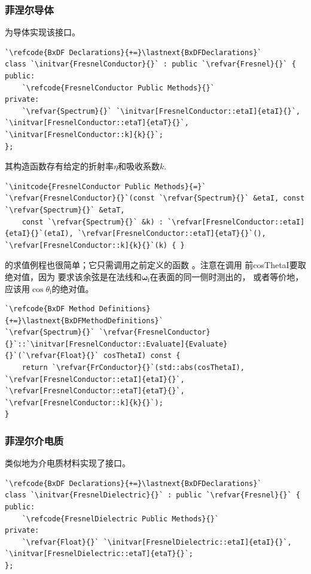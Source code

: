 \subsubsection*{菲涅尔导体}
为导体实现该接口。
\begin{lstlisting}
`\refcode{BxDF Declarations}{+=}\lastnext{BxDFDeclarations}`
class `\initvar{FresnelConductor}{}` : public `\refvar{Fresnel}{}` {
public:
    `\refcode{FresnelConductor Public Methods}{}`
private:
    `\refvar{Spectrum}{}` `\initvar[FresnelConductor::etaI]{etaI}{}`, `\initvar[FresnelConductor::etaT]{etaT}{}`, `\initvar[FresnelConductor::k]{k}{}`;
};
\end{lstlisting}

其构造函数存有给定的折射率$\eta$和吸收系数$k$.
\begin{lstlisting}
`\initcode{FresnelConductor Public Methods}{=}`
`\refvar{FresnelConductor}{}`(const `\refvar{Spectrum}{}` &etaI, const `\refvar{Spectrum}{}` &etaT,
    const `\refvar{Spectrum}{}` &k) : `\refvar[FresnelConductor::etaI]{etaI}{}`(etaI), `\refvar[FresnelConductor::etaT]{etaT}{}`(), `\refvar[FresnelConductor::k]{k}{}`(k) { }
\end{lstlisting}

的求值例程也很简单；它只需调用之前定义的函数
。注意在调用
前{\ttfamily cosThetaI}要取绝对值，因为
要求该余弦是在法线和${\bm\omega}_{\mathrm{i}}$在表面的同一侧时测出的，
或者等价地，应该用$\cos\theta_{\mathrm{i}}$的绝对值。
\begin{lstlisting}
`\refcode{BxDF Method Definitions}{+=}\lastnext{BxDFMethodDefinitions}`
`\refvar{Spectrum}{}` `\refvar{FresnelConductor}{}`::`\initvar[FresnelConductor::Evaluate]{Evaluate}{}`(`\refvar{Float}{}` cosThetaI) const {
    return `\refvar{FrConductor}{}`(std::abs(cosThetaI), `\refvar[FresnelConductor::etaI]{etaI}{}`, `\refvar[FresnelConductor::etaT]{etaT}{}`, `\refvar[FresnelConductor::k]{k}{}`);
}
\end{lstlisting}

\subsubsection*{菲涅尔介电质}
类似地为介电质材料实现了接口。
\begin{lstlisting}
`\refcode{BxDF Declarations}{+=}\lastnext{BxDFDeclarations}`
class `\initvar{FresnelDielectric}{}` : public `\refvar{Fresnel}{}` {
public:
    `\refcode{FresnelDielectric Public Methods}{}`
private:
    `\refvar{Float}{}` `\initvar[FresnelDielectric::etaI]{etaI}{}`, `\initvar[FresnelDielectric::etaT]{etaT}{}`;
};
\end{lstlisting}

